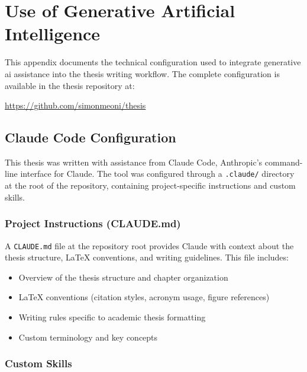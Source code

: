 
\chapter{Use of Generative Artificial Intelligence}
\label{appendix:ai_usage}

This appendix documents the technical configuration used to integrate generative \gls{ai} assistance into the thesis writing workflow.
The complete configuration is available in the thesis repository at:

\begin{center}
\url{https://github.com/simonmeoni/thesis}
\end{center}

\section{Claude Code Configuration}

This thesis was written with assistance from Claude Code, Anthropic's command-line interface for Claude.
The tool was configured through a \texttt{.claude/} directory at the root of the repository, containing project-specific instructions and custom skills.

\subsection{Project Instructions (CLAUDE.md)}

A \texttt{CLAUDE.md} file at the repository root provides Claude with context about the thesis structure, LaTeX conventions, and writing guidelines.
This file includes:
\begin{itemize}
    \item Overview of the thesis structure and chapter organization
    \item LaTeX conventions (citation styles, acronym usage, figure references)
    \item Writing rules specific to academic thesis formatting
    \item Custom terminology and key concepts
\end{itemize}

\subsection{Custom Skills}

